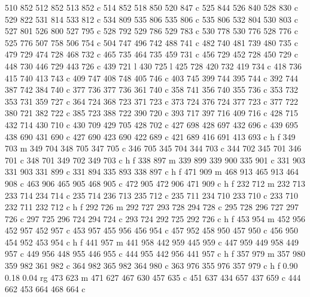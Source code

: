 {{        510 852 512 852 513 852 c
        514 852 518 850 520 847 c
        525 844 526 840 528 830 c
        529 822 531 814 533 812 c
        534 809 535 806 535 806 c
        535 806 532 804 530 803 c
        527 801 526 800 527 795 c
        528 792 529 786 529 783 c
        530 778 530 776 528 776 c
        525 776 507 758 506 754 c
        504 747 496 742 488 741 c
        482 740 481 739 480 735 c
        479 729 474 728 468 732 c
        465 735 464 735 459 731 c
        456 729 452 728 450 729 c
        448 730 446 729 443 726 c
        439 721 l
        430 725 l
        425 728 420 732 419 734 c
        418 736 415 740 413 743 c
        409 747 408 748 405 746 c
        403 745 399 744 395 744 c
        392 744 387 742 384 740 c
        377 736 377 736 361 740 c
        358 741 356 740 355 736 c
        353 732 353 731 359 727 c
        364 724 368 723 371 723 c
        373 724 376 724 377 723 c
        377 722 380 721 382 722 c
        385 723 388 722 390 720 c
        393 717 397 716 409 716 c
        428 715 432 714 430 710 c
        430 709 429 705 428 702 c
        427 698 428 697 432 696 c
        439 695 438 690 431 690 c
        427 690 423 690 422 689 c
        421 689 416 691 413 693 c
        h f
        349 703 m
        349 704 348 705 347 705 c
        346 705 345 704 344 703 c
        344 702 345 701 346 701 c
        348 701 349 702 349 703 c
        h f
        338 897 m
        339 899 339 900 335 901 c
        331 903 331 903 331 899 c
        331 894 335 893 338 897 c
        h f
        471 909 m
        468 913 465 913 464 908 c
        463 906 465 905 468 905 c
        472 905 472 906 471 909 c
        h f
        232 712 m
        232 713 233 714 234 714 c
        235 714 236 713 235 712 c
        235 711 234 710 233 710 c
        233 710 232 711 232 712 c
        h f
        292 726 m
        292 727 293 728 294 728 c
        295 728 296 727 297 726 c
        297 725 296 724 294 724 c
        293 724 292 725 292 726 c
        h f
        453 954 m
        452 956 452 957 452 957 c
        453 957 455 956 456 954 c
        457 952 458 950 457 950 c
        456 950 454 952 453 954 c
        h f
        441 957 m
        441 958 442 959 445 959 c
        447 959 449 958 449 957 c
        449 956 448 955 446 955 c
        444 955 442 956 441 957 c
        h f
        357 979 m
        357 980 359 982 361 982 c
        364 982 365 982 364 980 c
        363 976 355 976 357 979 c
        h f
        0.90 0.18 0.04 rg
        473 623 m
        471 627 467 630 457 635 c
        451 637 434 657 437 659 c
        444 662 453 664 468 664 c
}}
